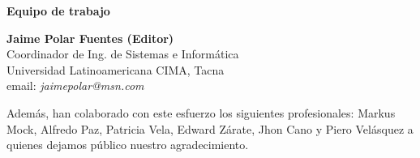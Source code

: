 \begin{center}
{\bf \Huge Equipo de trabajo}
\end{center}
\vspace{1cm}

\begin{center}
\textbf{Jaime Polar Fuentes (Editor)}\\
Coordinador de Ing. de Sistemas e Informática \\
Universidad Latinoamericana CIMA, Tacna\\
email: \textit{jaimepolar@msn.com}\\
\end{center}



Además, han colaborado con este esfuerzo los siguientes profesionales: Markus Mock, Alfredo Paz, Patricia Vela, Edward Zárate, Jhon Cano y Piero Velásquez a quienes dejamos público nuestro agradecimiento.
